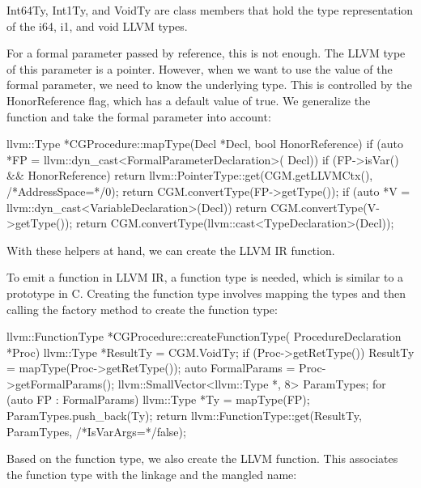 Int64Ty, Int1Ty, and VoidTy are class members that hold the type representation of the i64, i1, and void LLVM types.

For a formal parameter passed by reference, this is not enough. The LLVM type of this parameter is a pointer. However, when we want to use the value of the formal parameter, we need to know the underlying type. This is controlled by the HonorReference flag, which has a default value of true. We generalize the function and take the formal parameter into account:

\begin{cpp}
llvm::Type *CGProcedure::mapType(Decl *Decl,
                                 bool HonorReference) {
    if (auto *FP = llvm::dyn_cast<FormalParameterDeclaration>(
    Decl)) {
        if (FP->isVar() && HonorReference)
        return llvm::PointerType::get(CGM.getLLVMCtx(),
        /*AddressSpace=*/0);
        return CGM.convertType(FP->getType());
    }
    if (auto *V = llvm::dyn_cast<VariableDeclaration>(Decl))
        return CGM.convertType(V->getType());
    return CGM.convertType(llvm::cast<TypeDeclaration>(Decl));
}
\end{cpp}

With these helpers at hand, we can create the LLVM IR function.


To emit a function in LLVM IR, a function type is needed, which is similar to a prototype in C. Creating the function type involves mapping the types and then calling the factory method to create the function type:

\begin{cpp}
llvm::FunctionType *CGProcedure::createFunctionType(
ProcedureDeclaration *Proc) {
    llvm::Type *ResultTy = CGM.VoidTy;
    if (Proc->getRetType()) {
        ResultTy = mapType(Proc->getRetType());
    }
    auto FormalParams = Proc->getFormalParams();
    llvm::SmallVector<llvm::Type *, 8> ParamTypes;
    for (auto FP : FormalParams) {
        llvm::Type *Ty = mapType(FP);
        ParamTypes.push_back(Ty);
    }
    return llvm::FunctionType::get(ResultTy, ParamTypes,
                                    /*IsVarArgs=*/false);
}
\end{cpp}

Based on the function type, we also create the LLVM function. This associates the function type with the linkage and the mangled name:

\begin{cpp}
llvm::Function *
CGProcedure::createFunction(ProcedureDeclaration *Proc,
                            llvm::FunctionType *FTy) {
    llvm::Function *Fn = llvm::Function::Create(
        Fty, llvm::GlobalValue::ExternalLinkage,
        CGM.mangleName(Proc), CGM.getModule());
\end{cpp}

